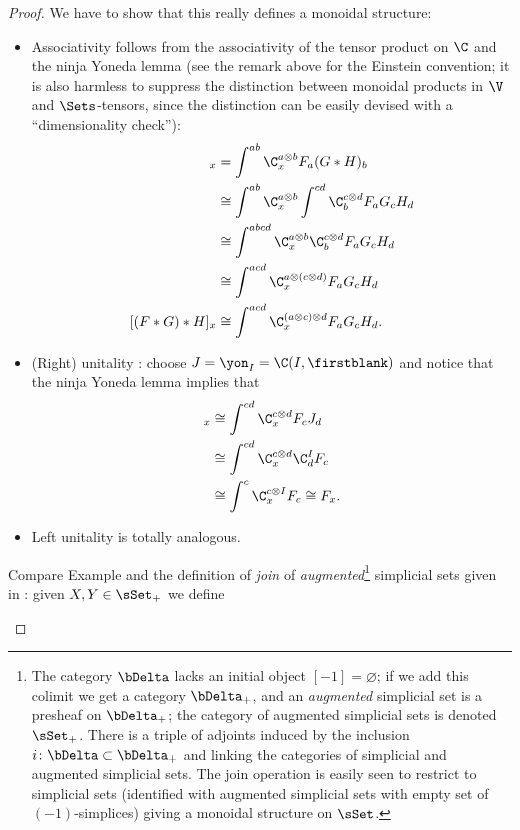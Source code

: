 \begin{proof}
We have to show that this really defines a monoidal structure:
\begin{itemize}
\item Associativity follows from the associativity of the tensor product on $\C$ and the ninja Yoneda lemma (see the remark above for the Einstein convention; it is also harmless to suppress the distinction between monoidal products in $\V$ and $\Sets$-tensors, since the distinction can be easily devised with a ``dimensionality check''):
\begin{align*}
[F\ast(G\ast H)]_x &= \int^{ab}\C^{a\otimes b}_x F_a (G\ast H)_b\\
&\cong \int^{ab}\C^{a\otimes b}_x \int^{cd}\C^{c\otimes d}_b F_a G_c H_d\\
&\cong \int^{abcd}\C^{a\otimes b}_x \C^{c\otimes d}_b F_a G_c H_d\\
&\cong \int^{acd}\C^{a\otimes(c\otimes d)}_x F_a G_c H_d\\
[(F\ast G)\ast H]_x&\cong \int^{acd}\C^{(a\otimes c)\otimes d}_x F_a G_c H_d.
\end{align*}
\item (Right) unitality : choose $J=\yon_I=\C(I,\firstblank)$ and notice that the ninja Yoneda lemma implies that
\begin{align*}
[F\ast J]_x&\cong \int^{cd}\C^{c\otimes d}_x F_c J_d\\
&\cong \int^{cd}\C^{c\otimes d}_x \C^I_d F_c\\
&\cong \int^c\C^{c\otimes I}_x F_c\cong F_x.
\end{align*}
\item Left unitality is totally analogous.
\end{itemize}
\begin{example}
Compare Example  and the definition of \emph{join} of \emph{augmented}\footnote{The category $\bDelta$ lacks an initial object $[-1] = \varnothing$; if we add this colimit we get a category $\bDelta_+$, and an \emph{augmented} simplicial set is a presheaf on $\bDelta_+$; the category of augmented simplicial sets is denoted $\sSet_+$. There is a triple of adjoints induced by the inclusion $i\colon \bDelta \subset \bDelta_+$ and linking the categories of simplicial and augmented simplicial sets. The join operation is easily seen to restrict to simplicial sets (identified with augmented simplicial sets with empty set of $(-1)$-simplices) giving a monoidal structure on $\sSet$.} simplicial sets given in \cite{Joy}: given $X, Y \in\sSet_+$ we define

\end{example}
\end{proof}
